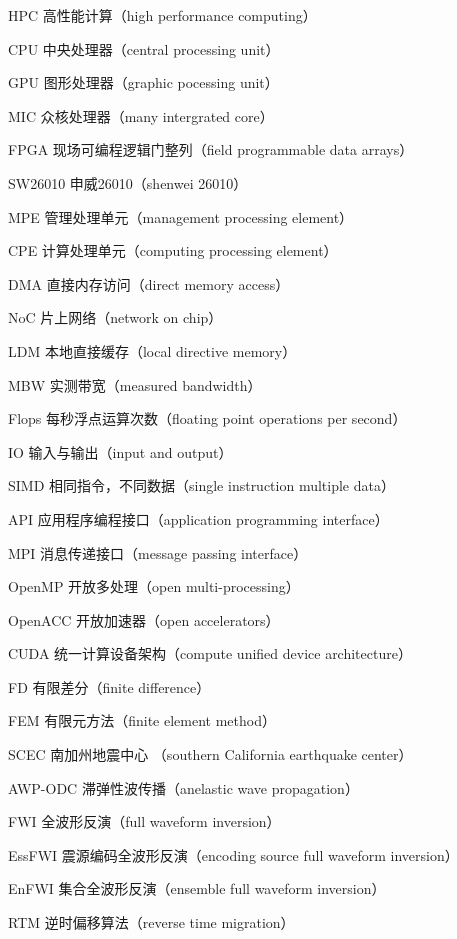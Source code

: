 \begin{denotation}
\item[HPC] 高性能计算（high performance computing）
\item[CPU] 中央处理器（central processing unit）
\item[GPU] 图形处理器（graphic pocessing unit）
\item[MIC] 众核处理器（many intergrated core）
\item[FPGA] 现场可编程逻辑门整列（field programmable data arrays）
\item[SW26010] 申威26010（shenwei 26010）
\item[MPE] 管理处理单元（management processing element）
\item[CPE] 计算处理单元（computing processing element）
\item[DMA] 直接内存访问（direct memory access）
\item[NoC] 片上网络（network on chip）
\item[LDM] 本地直接缓存（local directive memory）
\item[MBW] 实测带宽（measured bandwidth）
\item[Flops] 每秒浮点运算次数（floating point operations per second）
\item[IO] 输入与输出（input and output）
\item[SIMD] 相同指令，不同数据（single instruction multiple data）
\item[API] 应用程序编程接口（application programming interface）
\item[MPI] 消息传递接口（message passing interface）
\item[OpenMP] 开放多处理（open multi-processing）
\item[OpenACC] 开放加速器（open accelerators）
\item[CUDA] 统一计算设备架构（compute unified device architecture）
\item[FD] 有限差分（finite difference）
\item[FEM] 有限元方法（finite element method）
\item[SCEC] 南加州地震中心 （southern California earthquake center）
\item[AWP-ODC] 滞弹性波传播（anelastic wave propagation）
\item[FWI] 全波形反演（full waveform inversion）
\item[EssFWI] 震源编码全波形反演（encoding source full waveform inversion）
\item[EnFWI] 集合全波形反演（ensemble full waveform inversion）
\item[RTM] 逆时偏移算法（reverse time migration）
\end{denotation}

